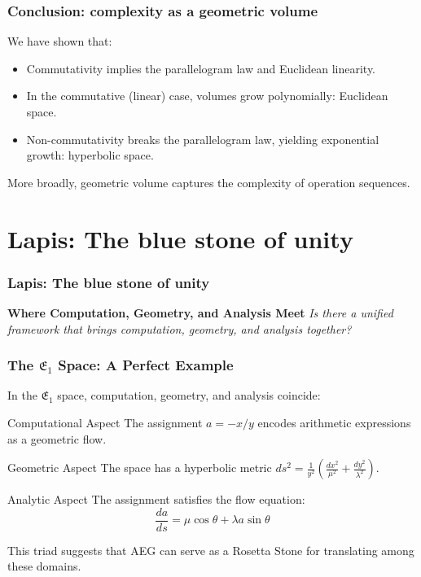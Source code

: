 \documentclass[aspectratio=169]{beamer}
\begin{document}
\begin{frame}
    \frametitle{Conclusion: complexity as a geometric volume}
    We have shown that:
    \begin{itemize}
        \item Commutativity implies the parallelogram law and Euclidean linearity.
        \item In the commutative (linear) case, volumes grow polynomially: Euclidean space.
        \item Non-commutativity breaks the parallelogram law, yielding exponential growth: hyperbolic space.
    \end{itemize}
    More broadly, geometric volume captures the complexity of operation sequences.
\end{frame}


\section{Lapis: The blue stone of unity}

\begin{frame}
    \frametitle{Lapis: The blue stone of unity}
    \begin{center}
        \Large
        \textbf{Where Computation, Geometry, and Analysis Meet}\newline\newline
        \emph{Is there a unified framework that brings computation, geometry, and analysis together?}
    \end{center}
\end{frame}

\begin{frame}
    \frametitle{The $\mathfrak{E}_1$ Space: A Perfect Example}
    In the $\mathfrak{E}_1$ space, computation, geometry, and analysis coincide:

    \begin{block}{Computational Aspect}
    The assignment $a = -x/y$ encodes arithmetic expressions as a geometric flow.
    \end{block}

    \begin{block}{Geometric Aspect}
    The space has a hyperbolic metric $ds^2 = \frac{1}{y^2}(\frac{dx^2}{\mu^2} + \frac{dy^2}{\lambda^2})$.
    \end{block}

    \begin{block}{Analytic Aspect}
    The assignment satisfies the flow equation:
    \[
        \frac{da}{ds} = \mu \cos \theta + \lambda a \sin \theta
    \]
    \end{block}

    This triad suggests that AEG can serve as a Rosetta Stone for translating among these domains.
\end{frame}
\end{document}
